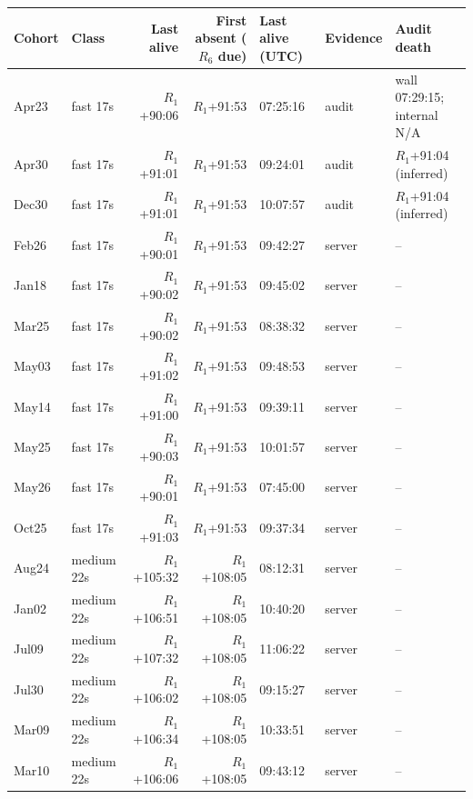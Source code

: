 \begin{tabular}{llrrlll}
\toprule
Cohort & Class & Last alive & First absent ($R_6$ due) & Last alive (UTC) & Evidence & Audit death \\
\midrule
Apr23 & fast 17s & $R_1$+90:06 & $R_1$+91:53 & 07:25:16 & audit & wall 07:29:15; internal N/A \\
Apr30 & fast 17s & $R_1$+91:01 & $R_1$+91:53 & 09:24:01 & audit & $R_1$+91:04 (inferred) \\
Dec30 & fast 17s & $R_1$+91:01 & $R_1$+91:53 & 10:07:57 & audit & $R_1$+91:04 (inferred) \\
Feb26 & fast 17s & $R_1$+90:01 & $R_1$+91:53 & 09:42:27 & server & -- \\
Jan18 & fast 17s & $R_1$+90:02 & $R_1$+91:53 & 09:45:02 & server & -- \\
Mar25 & fast 17s & $R_1$+90:02 & $R_1$+91:53 & 08:38:32 & server & -- \\
May03 & fast 17s & $R_1$+91:02 & $R_1$+91:53 & 09:48:53 & server & -- \\
May14 & fast 17s & $R_1$+91:00 & $R_1$+91:53 & 09:39:11 & server & -- \\
May25 & fast 17s & $R_1$+90:03 & $R_1$+91:53 & 10:01:57 & server & -- \\
May26 & fast 17s & $R_1$+90:01 & $R_1$+91:53 & 07:45:00 & server & -- \\
Oct25 & fast 17s & $R_1$+91:03 & $R_1$+91:53 & 09:37:34 & server & -- \\
Aug24 & medium 22s & $R_1$+105:32 & $R_1$+108:05 & 08:12:31 & server & -- \\
Jan02 & medium 22s & $R_1$+106:51 & $R_1$+108:05 & 10:40:20 & server & -- \\
Jul09 & medium 22s & $R_1$+107:32 & $R_1$+108:05 & 11:06:22 & server & -- \\
Jul30 & medium 22s & $R_1$+106:02 & $R_1$+108:05 & 09:15:27 & server & -- \\
Mar09 & medium 22s & $R_1$+106:34 & $R_1$+108:05 & 10:33:51 & server & -- \\
Mar10 & medium 22s & $R_1$+106:06 & $R_1$+108:05 & 09:43:12 & server & -- \\

\end{tabular}
